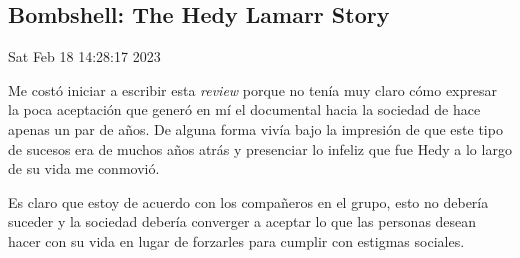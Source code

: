 \documentclass{article}
\theoremstyle{definition}
\begin{document}
\begin{itemize}
\begin{flushleft}
\subsection{Bombshell: The Hedy Lamarr Story}
Sat Feb 18 14:28:17 2023

Me costó iniciar a escribir esta \textit{review} porque no tenía muy 
claro cómo expresar la poca aceptación que generó en mí el documental 
hacia la sociedad de hace apenas un par de años. De alguna forma 
vivía bajo la impresión de que este tipo de sucesos era de muchos años 
atrás y presenciar lo infeliz que fue Hedy a lo largo de su vida me 
conmovió.

Es claro que estoy de acuerdo con los compañeros en el grupo, esto no 
debería suceder y la sociedad debería converger a aceptar lo que las 
personas desean hacer con su vida en lugar de forzarles para cumplir con 
estigmas sociales.

\subsection{}

\end{flushleft}


\end{itemize}
\end{document}
